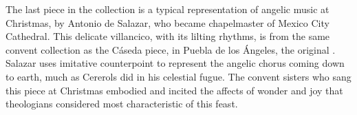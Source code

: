 The last piece in the collection is a typical representation of angelic music 
at Christmas, by Antonio de Salazar, who became chapelmaster of Mexico City 
Cathedral.%
    \Autocite[29--34]{Cashner:PhD}
This delicate villancico, with its lilting rhythms, is from the same convent 
collection as the Cáseda piece, in Puebla de los Ángeles, the original
.  
Salazar uses imitative counterpoint to represent the angelic chorus coming down 
to earth, much as Cererols did in his celestial fugue. 
The convent sisters who sang this piece at Christmas embodied and incited the 
affects of wonder and joy that theologians considered most characteristic of 
this feast.


